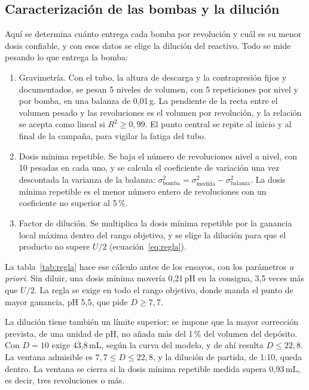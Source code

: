 \subsection{Caracterización de las bombas y la dilución}\label{sec:carbom}

Aquí se determina cuánto entrega cada bomba por revolución y cuál es su menor dosis confiable, y con esos datos se elige la dilución del reactivo. Todo se mide pesando lo que entrega la bomba:
\begin{enumerate}
\item Gravimetría. Con el tubo, la altura de descarga y la contrapresión fijos y documentados, se pesan 5 niveles de volumen, con 5 repeticiones por nivel y por bomba, en una balanza de 0,01\,g. La pendiente de la recta entre el volumen pesado y las revoluciones es el volumen por revolución, y la relación se acepta como lineal si $R^2\ge0{,}99$. El punto central se repite al inicio y al final de la campaña, para vigilar la fatiga del tubo.
\item Dosis mínima repetible. Se baja el número de revoluciones nivel a nivel, con 10 pesadas en cada uno, y se calcula el coeficiente de variación una vez descontada la varianza de la balanza: $\sigma^2_{\text{bomba}}=\sigma^2_{\text{medida}}-\sigma^2_{\text{balanza}}$. La dosis mínima repetible es el menor número entero de revoluciones con un coeficiente no superior al 5\,\%.
\item Factor de dilución. Se multiplica la dosis mínima repetible por la ganancia local máxima dentro del rango objetivo, y se elige la dilución para que el producto no supere $U/2$ (ecuación~\eqref{eq:regla}).
\end{enumerate}
La tabla~\ref{tab:regla} hace ese cálculo antes de los ensayos, con los parámetros \emph{a priori}. Sin diluir, una dosis mínima movería 0,21\,pH en la consigna, 3,5 veces más que $U/2$. La regla se exige en todo el rango objetivo, donde manda el punto de mayor ganancia, pH 5,5, que pide $D\ge7{,}7$.


La dilución tiene también un límite superior: se impone que la mayor corrección prevista, de una unidad de pH, no añada más del 1\,\% del volumen del depósito. Con $D=10$ exige 43,8\,mL, según la curva del modelo, y de ahí resulta $D\le22{,}8$. La ventana admisible es $7{,}7\le D\le22{,}8$, y la dilución de partida, de 1:10, queda dentro. La ventana se cierra si la dosis mínima repetible medida supera 0,93\,mL, es decir, tres revoluciones o más.

